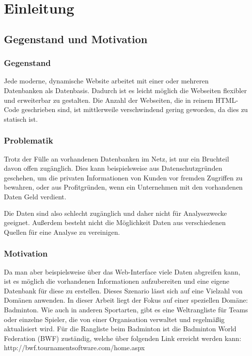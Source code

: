 \documentclass[12pt,a4paper]{scrreprt}
\begin{document}
 
\newpage

\tableofcontents 
\newpage

\chapter{Einleitung}
\section{Gegenstand und Motivation}
\subsection{Gegenstand}
Jede moderne, dynamische Website arbeitet mit einer oder mehreren Datenbanken als Datenbasis. Dadurch ist es leicht möglich die Webseiten flexibler und erweiterbar zu gestalten. Die Anzahl der Webseiten, die in reinem HTML-Code geschrieben sind, ist mittlerweile verschwindend gering geworden, da dies zu statisch ist. 

\subsection{Problematik}
Trotz der Fülle an vorhandenen Datenbanken im Netz, ist nur ein Bruchteil davon offen zugänglich. Dies kann beispielsweise aus Datenschutzgründen geschehen, um die privaten Informationen von Kunden vor fremden Zugriffen zu bewahren, oder aus Profitgründen, wenn ein Unternehmen mit den vorhandenen Daten Geld verdient. 

Die Daten sind also schlecht zugänglich und daher nicht für Analysezwecke geeignet. Außerdem besteht nicht die Möglichkeit Daten aus verschiedenen Quellen für eine Analyse zu vereinigen. 

\subsection{Motivation}
Da man aber beispielsweise über das Web-Interface viele Daten abgreifen kann, ist es möglich die vorhandenen Informationen aufzubereiten und eine eigene Datenbank für diese zu erstellen. Dieses Szenario lässt sich auf eine Vielzahl von Domänen anwenden. In dieser Arbeit liegt der Fokus auf einer speziellen Domäne: Badminton. Wie auch in anderen Sportarten, gibt es eine Weltrangliste für Teams oder einzelne Spieler, die von einer Organisation verwaltet und regelmäßig aktualisiert wird. Für die Rangliste beim Badminton ist die Badminton World Federation (BWF) zuständig, welche über folgenden Link erreicht werden kann: http://bwf.tournamentsoftware.com/home.aspx \cite{BWF2015}
\end{document}

